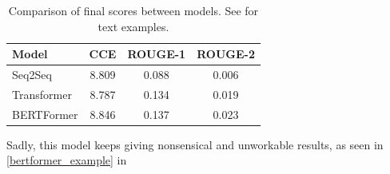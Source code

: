 \begin{table}[h]
	\centering
	\small
	\begin{tabular}{l | c c c}
		\toprule
			Model & CCE & ROUGE-1 & ROUGE-2 \\
		\midrule
			Seq2Seq & 8.809 & 0.088 & 0.006 \\
			Transformer & 8.787 & 0.134 & 0.019 \\
			BERTFormer & 8.846 & 0.137 & 0.023 \\
		\bottomrule
	\end{tabular}
	\caption{Comparison of final scores between models. See \appendixA{} for text examples.}
	\label{comparison_table}
\end{table}

Sadly, this model keeps giving nonsensical and unworkable results, as seen in \cref{bertformer_example} in \appendixA{}
